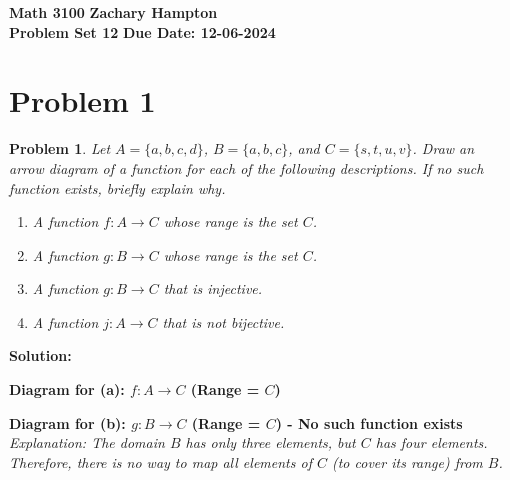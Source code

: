 \documentclass[12pt]{article}
\newtheorem{problem}{Problem}
\theoremstyle{definition}
\begin{document}
\textbf{Math 3100} \hfill \textbf{Zachary Hampton} \\
\textbf{Problem Set 12} \hfill \textbf{Due Date: 12-06-2024}

\bigskip

\section*{Problem 1}

\begin{problem}
Let $A = \{a, b, c, d\}$, $B = \{a, b, c\}$, and $C = \{s, t, u, v\}$. Draw an arrow diagram of a function for each of the following descriptions. If no such function exists, briefly explain why.

\begin{enumerate}[label=(\alph*)]
    \item A function $f : A \to C$ whose range is the set $C$.
    \item A function $g : B \to C$ whose range is the set $C$.
    \item A function $g : B \to C$ that is injective.
    \item A function $j : A \to C$ that is not bijective.
\end{enumerate}
\end{problem}

\textbf{Solution:}

\begin{center}
\textbf{Diagram for (a): $f : A \to C$ (Range = $C$)}
\newline
\newline
{}
\end{center}

\begin{center}
\textbf{Diagram for (b): $g : B \to C$ (Range = $C$) - No such function exists}
\newline
\newline
\textit{Explanation: The domain $B$ has only three elements, but $C$ has four elements. Therefore, there is no way to map all elements of $C$ (to cover its range) from $B$.}
\end{center}
\end{document}
